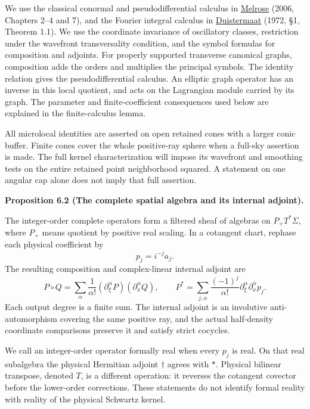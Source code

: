 \documentclass[
  english,
  11pt,
  reqno]{amsart}
\makeatletter
\newcommand{\pandocstatementheading}[1]{%
  \par\if@nobreak\else
    \addpenalty{\@beginparpenalty}%
    \addvspace{.5\baselineskip plus .2\baselineskip minus .2\baselineskip}%
  \fi
  {\normalfont\bfseries #1\par}%
  \nobreak\@afterindenttrue\@afterheading
}
\makeatother
\begin{document}
We use the classical conormal and pseudodifferential calculus in
\hyperref[ref-Melrose2006]{Melrose} (2006, Chapters 2--4 and 7), and the
Fourier integral calculus in
\hyperref[ref-Duistermaat1972FIO]{Duistermaat} (1972, §1, Theorem 1.1).
We use the coordinate invariance of oscillatory classes, restriction
under the wavefront transversality condition, and the symbol formulas
for composition and adjoints. For properly supported transverse
canonical graphs, composition adds the orders and multiplies the
principal symbols. The identity relation gives the pseudodifferential
calculus. An elliptic graph operator has an inverse in this local
quotient, and acts on the Lagrangian module carried by its graph. The
parameter and finite-coefficient consequences used below are explained
in the finite-calculus lemma.

All microlocal identities are asserted on open retained cones with a
larger conic buffer. Finite cones cover the whole positive-ray sphere
when a full-sky assertion is made. The full kernel characterization will
impose its wavefront and smoothing tests on the entire retained point
neighborhood squared. A statement on one angular cap alone does not
imply that full assertion.

\pandocstatementheading{\leavevmode{}\label{prop:online-formal-symbol-algebra}Proposition 6.2 (The complete spatial algebra and its internal adjoint).}

The integer-order complete operators form a filtered sheaf of algebras
on \(P_+T^*\Sigma\), where \(P_+\) means quotient by positive real
scaling. In a cotangent chart, rephase each physical coefficient by%
 \[
p_j=i^{-j}a_j.
\] The resulting composition and complex-linear internal adjoint are%
 \[
P\circ Q=
\sum_\alpha\frac1{\alpha!}
(\partial_\xi^\alpha P)(\partial_x^\alpha Q),
\qquad
P^*=
\sum_{j,\alpha}\frac{(-1)^j}{\alpha!}
\partial_\xi^\alpha\partial_x^\alpha p_j.
\] Each output degree is a finite sum. The internal adjoint is an
involutive anti-automorphism covering the same positive ray, and the
actual half-density coordinate comparisons preserve it and satisfy
strict cocycles.

We call an integer-order operator formally real when every \(p_j\) is
real. On that real subalgebra the physical Hermitian adjoint \(\dagger\)
agrees with \(*\). Physical bilinear transpose, denoted \(T\), is a
different operation: it reverses the cotangent covector before the
lower-order corrections. These statements do not identify formal reality
with reality of the physical Schwartz kernel.
\end{document}

